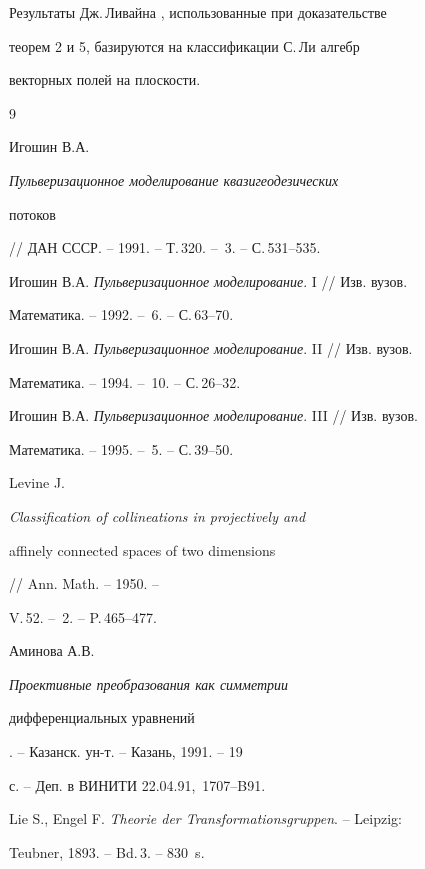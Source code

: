 \begin{notenonum} 


Результаты Дж.\,Ливайна \cite{5}, использованные при доказательстве 


теорем 2 и 5, базируются на классификации С.\,Ли \cite{7} алгебр 


векторных полей на плоскости. 


\end{notenonum} 


 


 


\begin{thebibliography}{9} 


 




Игошин В.А. {\em Пульверизационное моделирование квазигеодезических 


потоков} // ДАН СССР. -- 1991. -- Т.\,320. -- \No\,3. -- С.\,531--535. 




Игошин В.А. {\em Пульверизационное моделирование}. I // Изв. вузов. 


Математика. -- 1992. -- \No\,6. -- С.\,63--70. 




Игошин В.А. {\em Пульверизационное моделирование}. II // Изв. вузов. 


Математика. -- 1994. -- \No\,10. -- С.\,26--32. 




Игошин В.А. {\em Пульверизационное моделирование}. III // Изв. вузов. 


Математика. -- 1995. -- \No\,5. -- С.\,39--50. 




Levine J. {\em Classification of collineations in projectively and 


affinely connected spaces of two dimensions} // Ann. Math. -- 1950. -- 


V.\,52. -- \No\,2. -- P.\,465--477. 




Аминова А.В. {\em Проективные преобразования как симметрии 


дифференциальных уравнений}. -- Казанск. ун-т. -- Казань, 1991. -- 19 


с. -- Деп. в ВИНИТИ 22.04.91, \No\,1707--B91. 




Lie S., Engel F. {\em Theorie der Transformationsgruppen}. -- Leipzig: 


Teubner, 1893. -- Bd.\,3. -- 830~s. 


 


\end{thebibliography} 


 


\vskip 2cm 


 






 


\label{end} 


 


